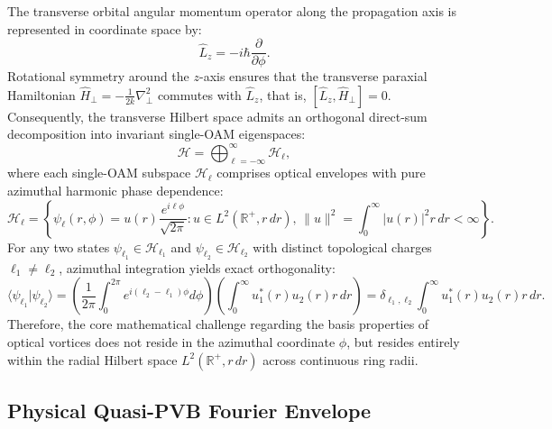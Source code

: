 \documentclass[11pt,a4paper]{article}
\begin{document}
The transverse orbital angular momentum operator along the propagation axis is represented in coordinate space by:
\begin{equation}
\hat{L}_z = -i \hbar \frac{\partial}{\partial \phi}.
\label{eq:lz_operator}
\end{equation}
Rotational symmetry around the $z$-axis ensures that the transverse paraxial Hamiltonian $\hat{H}_\perp = -\frac{1}{2k} \nabla_\perp^2$ commutes with $\hat{L}_z$, that is, $[\hat{L}_z, \hat{H}_\perp] = 0$. Consequently, the transverse Hilbert space admits an orthogonal direct-sum decomposition into invariant single-OAM eigenspaces:
\begin{equation}
\mathcal{H} = \bigoplus_{\ell=-\infty}^\infty \mathcal{H}_\ell,
\label{eq:direct_sum_decomposition}
\end{equation}
where each single-OAM subspace $\mathcal{H}_\ell$ comprises optical envelopes with pure azimuthal harmonic phase dependence:
\begin{equation}
\mathcal{H}_\ell = \left\{ \psi_\ell(r, \phi) = u(r) \frac{e^{i \ell \phi}}{\sqrt{2\pi}} : u \in L^2(\mathbb{R}^+, r \, dr), \, \|u\|^2 = \int_0^\infty |u(r)|^2 r \, dr < \infty \right\}.
\label{eq:single_oam_subspace}
\end{equation}
For any two states $\psi_{\ell_1} \in \mathcal{H}_{\ell_1}$ and $\psi_{\ell_2} \in \mathcal{H}_{\ell_2}$ with distinct topological charges $\ell_1 \neq \ell_2$, azimuthal integration yields exact orthogonality:
\begin{equation}
\langle \psi_{\ell_1} | \psi_{\ell_2} \rangle = \left( \frac{1}{2\pi} \int_0^{2\pi} e^{i(\ell_2 - \ell_1)\phi} d\phi \right) \left( \int_0^\infty u_1^*(r) u_2(r) r \, dr \right) = \delta_{\ell_1, \ell_2} \int_0^\infty u_1^*(r) u_2(r) r \, dr.
\label{eq:azimuthal_orthogonality}
\end{equation}
Therefore, the core mathematical challenge regarding the basis properties of optical vortices does not reside in the azimuthal coordinate $\phi$, but resides entirely within the radial Hilbert space $L^2(\mathbb{R}^+, r \, dr)$ across continuous ring radii.

\subsection{Physical Quasi-PVB Fourier Envelope}
\end{document}
